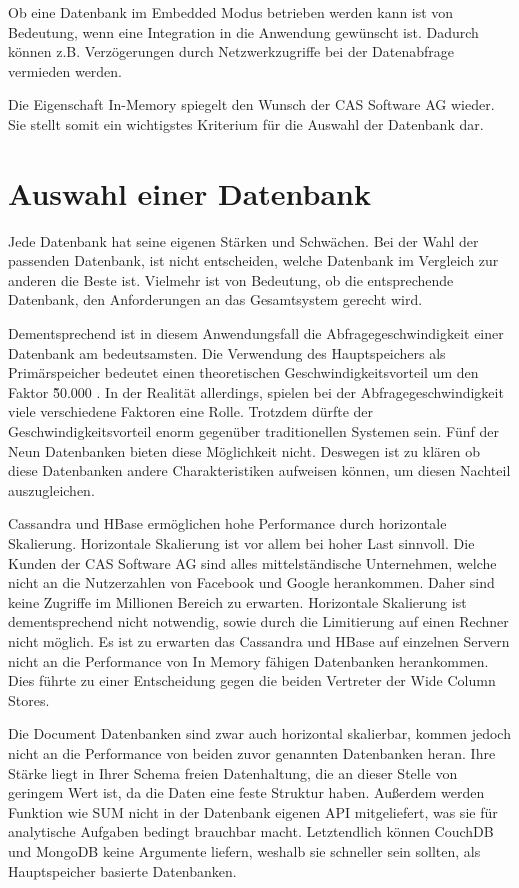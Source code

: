 Ob eine Datenbank im Embedded Modus betrieben werden kann ist von Bedeutung, wenn eine Integration in die Anwendung gewünscht ist. Dadurch können z.B. Verzögerungen durch Netzwerkzugriffe bei der Datenabfrage vermieden werden. 

Die Eigenschaft In-Memory spiegelt den Wunsch der CAS Software AG wieder. Sie stellt somit ein wichtigstes Kriterium für die Auswahl der Datenbank dar.

\section{Auswahl einer Datenbank}
\label{ch:AnalyseDatenbanken:sec:Ergebniss}

Jede Datenbank hat seine eigenen Stärken und Schwächen. Bei der Wahl der passenden Datenbank, ist nicht entscheiden, welche Datenbank im Vergleich zur anderen die Beste ist. Vielmehr ist von Bedeutung, ob die entsprechende Datenbank, den Anforderungen an das Gesamtsystem gerecht wird. 

Dementsprechend ist in diesem Anwendungsfall die Abfragegeschwindigkeit einer Datenbank am bedeutsamsten. Die Verwendung des Hauptspeichers als Primärspeicher bedeutet einen theoretischen Geschwindigkeitsvorteil um den Faktor \~50.000 \cite{SWB-394434307}.
In der Realität allerdings, spielen bei der Abfragegeschwindigkeit viele verschiedene Faktoren eine Rolle. Trotzdem dürfte der Geschwindigkeitsvorteil enorm gegenüber traditionellen Systemen sein. Fünf der Neun Datenbanken bieten diese Möglichkeit nicht. Deswegen ist zu klären ob diese Datenbanken andere Charakteristiken aufweisen können, um diesen Nachteil auszugleichen.

Cassandra und HBase ermöglichen hohe Performance durch horizontale Skalierung. Horizontale Skalierung ist vor allem bei hoher Last sinnvoll. Die Kunden der CAS Software AG sind alles mittelständische Unternehmen, welche nicht an die Nutzerzahlen von Facebook und Google herankommen. Daher sind keine Zugriffe im Millionen Bereich zu erwarten. Horizontale Skalierung ist dementsprechend nicht notwendig, sowie durch die Limitierung auf einen Rechner nicht möglich. Es ist zu erwarten das Cassandra und HBase auf einzelnen Servern nicht an die Performance von In Memory fähigen Datenbanken herankommen. Dies führte zu einer Entscheidung gegen die beiden Vertreter der Wide Column Stores.

Die Document Datenbanken sind zwar auch horizontal skalierbar, kommen jedoch nicht an die Performance von beiden zuvor genannten Datenbanken heran. Ihre Stärke liegt in Ihrer Schema freien Datenhaltung, die an dieser Stelle von geringem Wert ist, da die Daten eine feste Struktur haben. Außerdem werden Funktion wie SUM nicht in der Datenbank eigenen API mitgeliefert, was sie für analytische Aufgaben bedingt brauchbar macht. Letztendlich können CouchDB und MongoDB keine Argumente liefern, weshalb sie schneller sein sollten, als Hauptspeicher basierte Datenbanken.

